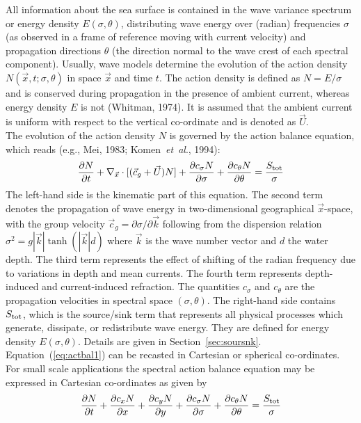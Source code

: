 \documentclass[12pt]{book}
\begin{document}
All information about the
sea surface is contained in the wave variance spectrum or energy density $E(\sigma,\theta)$,
distributing wave energy over (radian) frequencies $\sigma$ (as observed in a frame of
reference moving with current velocity) and propagation directions $\theta$ (the direction
normal to the wave crest of each spectral component). Usually, wave models determine the
evolution of the action density $N(\vec{x},t;\sigma,\theta)$ in space $\vec{x}$ and
time $t$. The action density is defined as $N = E/\sigma$ and is conserved during propagation
in the presence of ambient current, whereas energy density $E$ is not (Whitman, 1974).
It is assumed that the ambient current is uniform with respect to the vertical co-ordinate and is
denoted as $\vec{U}$.
\nocite{Whi74}
\\[2ex]
\noindent
The evolution of the action density $N$ is governed by the action balance equation,
which reads (e.g., Mei, 1983; Komen~{\it et~al}., 1994):
\begin{equation}
  \frac{\partial N}{\partial t} + \nabla_{\vec{x}} \cdot [({\vec{c}}_g + \vec{U}) N] +
  \frac{\partial c_\sigma N}{\partial \sigma} +
  \frac{\partial c_\theta N}{\partial \theta} = \frac{S_{\rm tot}}{\sigma}
  \label{eq:actbal1}
\end{equation}
The left-hand side is the kinematic part of this equation. The second term denotes
the propagation of wave energy in two-dimensional geographical $\vec{x}$-space, with
the group velocity ${\vec{c}}_g = \partial \sigma /\partial \vec{k}$ following from the
dispersion relation ${\sigma}^2 = g|\vec{k}|\tanh(|\vec{k}|d)$ where $\vec{k}$ is the wave
number vector and $d$ the water depth. The third term represents the effect of
shifting of the radian frequency due to variations in depth and mean currents. The fourth
term represents depth-induced and current-induced refraction. The quantities $c_\sigma$ and
$c_\theta$ are the propagation velocities in spectral space $(\sigma,\theta)$.
The right-hand side contains $S_{\rm tot}$, which is the source/sink term that
represents all physical processes which generate, dissipate, or redistribute wave energy.
They are defined for energy density $E(\sigma,\theta)$. Details are given in Section~\ref{sec:soursnk}.
\\[2ex]
\noindent
Equation~(\ref{eq:actbal1}) can be recasted in Cartesian or spherical
co-ordinates. For small scale applications the spectral action balance equation may
be expressed in Cartesian co-ordinates as given by
\begin{equation}
  \frac{\partial N}{\partial t} + \frac{\partial c_x N}{\partial x} + \frac{\partial c_y N}{\partial y} +
  \frac{\partial c_\sigma N}{\partial \sigma} + \frac{\partial c_\theta N}{\partial \theta} =
  \frac{S_{\rm tot}}{\sigma}
  \label{eq:actbal2}
\end{equation}
\end{document}

